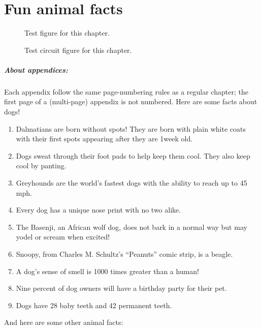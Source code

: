 
\chapter{Fun animal facts} %
\begin{figure}[htbp]
    \centering
    
    \caption{Test figure for this chapter.}
\end{figure}
\begin{figure}[htbp]
    \centering
    
    \caption{Test circuit figure for this chapter.}
\end{figure}


\paragraph{About appendices:}
	Each appendix follow the same page-numbering rules as a regular chapter; the
	first page of a (multi-page) appendix is not numbered.  Here are some facts about dogs!

\begin{enumerate}
	\item Dalmatians are born without spots!  They are born with plain white coats with their first spots appearing after they are 1week old.
	\item Dogs sweat through their foot pads to help keep them cool.  They also keep cool by panting.
	\item Greyhounds are the world's fastest dogs with the ability to reach up to 45 mph.
	\item Every dog has a unique nose print with no two alike.
	\item The Basenji, an African wolf dog, does not bark in a normal way but may yodel or scream when excited!
	\item Snoopy, from Charles M. Schultz's “Peanuts” comic strip, is a beagle.
	\item A dog's sense of smell is 1000 times greater than a human!
	\item Nine percent of dog owners will have a birthday party for their pet.
	\item Dogs have 28 baby teeth and 42 permanent teeth.
\end{enumerate}

And here are some other animal facts:

